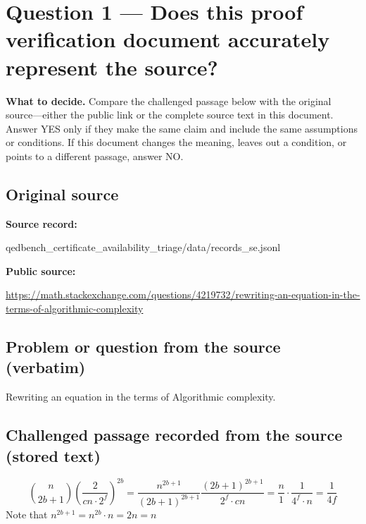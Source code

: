 \documentclass[11pt]{article}
\begin{document}
\section*{Question 1 --- Does this proof verification document accurately represent the source?}
\textbf{What to decide.} Compare the challenged passage below with the original source---either the public link or the complete source text in this document. Answer YES only if they make the same claim and include the same assumptions or conditions. If this document changes the meaning, leaves out a condition, or points to a different passage, answer NO.
\subsection*{Original source}
\textbf{Source record:}
\begin{Vsrc}
qedbench_certificate_availability_triage/data/records_se.jsonl
\end{Vsrc}
\textbf{Public source:}\par
\url{https://math.stackexchange.com/questions/4219732/rewriting-an-equation-in-the-terms-of-algorithmic-complexity}\par
\subsection*{Problem or question from the source (verbatim)}
\begin{Vsrc}
Rewriting an equation in the terms of Algorithmic complexity.
\end{Vsrc}
\subsection*{Challenged passage recorded from the source (stored text)}
\begin{Vsrc}
$$\binom{n}{2b+1}\left( \frac{2}{cn\cdot 2^f}\right)^{2b}= \frac{n^{2b+1}}{(2b+1)^{2b+1}} \frac{(2b+1)^{2b+1}}{2^f\cdot cn} = \frac{n}{1}\cdot\frac{1}{4^{f}\cdot n}=\frac{1}{4f}$$ Note that $n^{2b+1}=n^{2b}\cdot n = 2n = n$
\end{Vsrc}
\end{document}
